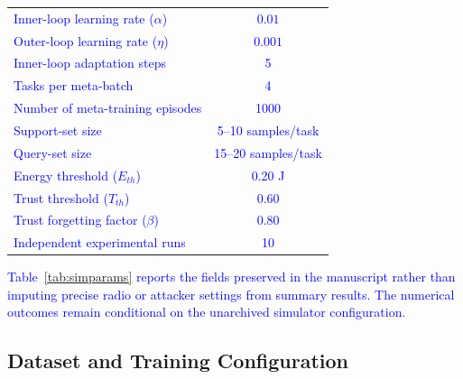 \documentclass[pdflatex,sn-mathphys-num]{sn-jnl}
\newcommand{\Revised}[1]{\textcolor{blue}{#1}}
\begin{document}
\begin{table}[ht]
\begin{tabular}{|l|c|}
\textcolor{blue}{Inner-loop learning rate ($\alpha$)} 
& \textcolor{blue}{$0.01$} \\

\textcolor{blue}{Outer-loop learning rate ($\eta$)} 
& \textcolor{blue}{$0.001$} \\

\textcolor{blue}{Inner-loop adaptation steps} 
& \textcolor{blue}{5} \\

\textcolor{blue}{Tasks per meta-batch} 
& \textcolor{blue}{4} \\

\textcolor{blue}{Number of meta-training episodes} 
& \textcolor{blue}{1000} \\

\textcolor{blue}{Support-set size} 
& \textcolor{blue}{5--10 samples/task} \\

\textcolor{blue}{Query-set size} 
& \textcolor{blue}{15--20 samples/task} \\

\textcolor{blue}{Energy threshold ($E_{th}$)} 
& \textcolor{blue}{0.20 J} \\

\textcolor{blue}{Trust threshold ($T_{th}$)} 
& \textcolor{blue}{0.60} \\

\textcolor{blue}{Trust forgetting factor ($\beta$)} 
& \textcolor{blue}{0.80} \\

\textcolor{blue}{Independent experimental runs} 
& \textcolor{blue}{10} \\

\hline
\end{tabular}
\end{table}


\Revised{Table~\ref{tab:simparams} reports the fields preserved in the manuscript rather than imputing precise radio or attacker settings from summary results. The numerical outcomes remain conditional on the unarchived simulator configuration.}

\subsection{Dataset and Training Configuration}
\label{sec:datasets_r2}
\end{document}
